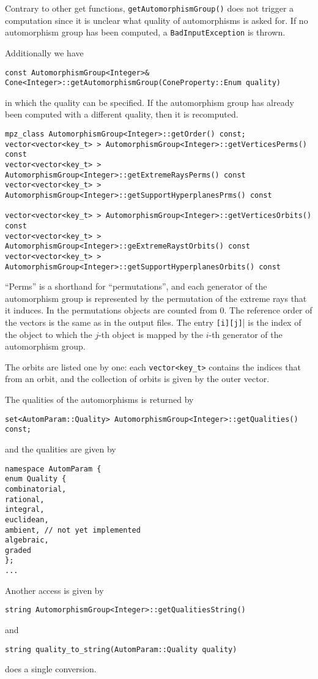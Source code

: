 \documentclass[12pt,a4paper]{scrartcl}
\theoremstyle{definition}
\begin{document}
\begin{small}
Contrary to other get functions, \verb|getAutomorphismGroup()| does not trigger a computation since it is unclear what quality of automorphisms is asked for. If no automorphism group has been computed, a \verb|BadInputException| is thrown.

Additionally we have
\begin{Verbatim}
const AutomorphismGroup<Integer>& 
Cone<Integer>::getAutomorphismGroup(ConeProperty::Enum quality)
\end{Verbatim}
in which the quality can be specified. If the automorphism group has already been computed with a different quality, then it is recomputed.


\begin{Verbatim}
mpz_class AutomorphismGroup<Integer>::getOrder() const;
vector<vector<key_t> > AutomorphismGroup<Integer>::getVerticesPerms() const
vector<vector<key_t> > AutomorphismGroup<Integer>::getExtremeRaysPerms() const
vector<vector<key_t> > AutomorphismGroup<Integer>::getSupportHyperplanesPrms() const

vector<vector<key_t> > AutomorphismGroup<Integer>::getVerticesOrbits() const
vector<vector<key_t> > AutomorphismGroup<Integer>::geExtremeRaystOrbits() const
vector<vector<key_t> > AutomorphismGroup<Integer>::getSupportHyperplanesOrbits() const
\end{Verbatim}

``Perms'' is a shorthand for ``permutations'', and each generator of the automorphism group is represented by the permutation of the extreme rays that it induces.   In the permutations objects are counted from $0$. The reference order of the vectors is the same as in the output files. The entry \verb|[i][j]|| is the index of the object to which the $j$-th object is mapped by the $i$-th generator of the automorphism group.

The orbits are listed one by one: each \verb|vector<key_t>| contains the indices that from an orbit, and the collection of orbits is given by the outer vector.

The qualities of the automorphisms is returned by  
\begin{Verbatim}
set<AutomParam::Quality> AutomorphismGroup<Integer>::getQualities() const;
\end{Verbatim}
and the qualities are given by   
\begin{Verbatim} 
namespace AutomParam {
enum Quality {    
combinatorial,
rational,
integral,
euclidean,
ambient, // not yet implemented
algebraic,
graded
};
...
\end{Verbatim}
Another access is given by
\begin{Verbatim}
string AutomorphismGroup<Integer>::getQualitiesString()
\end{Verbatim}
and 
\begin{Verbatim}
string quality_to_string(AutomParam::Quality quality)
\end{Verbatim}
does a single conversion.


\end{small}
\end{document}
